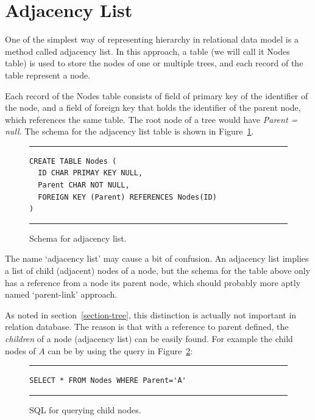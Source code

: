 
\section{Adjacency List}\label{sec-adj-list}

One of the simplest way of representing hierarchy in relational data model is a method called adjacency list. In this approach, a table (we will call it Nodes table) is used to store the nodes of one or multiple trees, and each record of the table represent a node.

Each record of the Nodes table consists of field of primary key of the identifier of the node, and a field of foreign key that holds the identifier of the parent node, which references the same table. The root node of a tree would have {\em Parent = null}. The schema for the adjacency list table is shown in Figure~\ref{fig:adj_list}.


\begin{figure}[h]
\hrule\vspace{6px}
\begin{verbatim}
CREATE TABLE Nodes (
  ID CHAR PRIMAY KEY NULL,
  Parent CHAR NOT NULL,
  FOREIGN KEY (Parent) REFERENCES Nodes(ID)
)
\end{verbatim}
\hrule
\caption{Schema for adjacency list.\label{fig:adj_list}}
\end{figure}

\begin{remark}[Note:]
The name `adjacency list' may cause a bit of confusion. An adjacency list implies a list of child (adjacent) nodes of a node, but the schema for the table above only has a reference from a node its parent node, which should probably more aptly named `parent-link' approach.

As noted in section~\ref{section-tree}, this distinction is actually not important in relation database. The reason is that with a reference to parent defined, the {\em children} of a node (adjacency list) can be easily found. For example the child nodes of $A$ can be by using the query in Figure~\ref{fig:child_query}:

\begin{figure}[h]
\hrule\vspace{6px}
\begin{verbatim}
SELECT * FROM Nodes WHERE Parent='A'
\end{verbatim}
\hrule
\caption{SQL for querying child nodes.\label{fig:child_query}}
\end{figure}
\end{remark}

